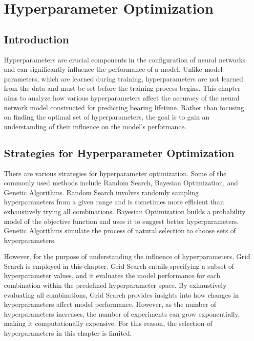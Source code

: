 \chapter{Hyperparameter Optimization}
\label{sec:hyperparameter_optimization}

\section{Introduction}

Hyperparameters are crucial components in the configuration of neural networks and can significantly influence the performance of a model. Unlike model parameters, which are learned during training, hyperparameters are not learned from the data and must be set before the training process begins. This chapter aims to analyze how various hyperparameters affect the accuracy of the neural network model constructed for predicting bearing lifetime. Rather than focusing on finding the optimal set of hyperparameters, the goal is to gain an understanding of their influence on the model's performance.


\section{Strategies for Hyperparameter Optimization}

There are various strategies for hyperparameter optimization. Some of the commonly used methods include Random Search, Bayesian Optimization, and Genetic Algorithms. Random Search involves randomly sampling hyperparameters from a given range and is sometimes more efficient than exhaustively trying all combinations. Bayesian Optimization builds a probability model of the objective function and uses it to suggest better hyperparameters. Genetic Algorithms simulate the process of natural selection to choose sets of hyperparameters.

However, for the purpose of understanding the influence of hyperparameters, Grid Search is employed in this chapter. Grid Search entails specifying a subset of hyperparameter values, and it evaluates the model performance for each combination within the predefined hyperparameter space. By exhaustively evaluating all combinations, Grid Search provides insights into how changes in hyperparameters affect model performance. However, as the number of hyperparameters increases, the number of experiments can grow exponentially, making it computationally expensive. For this reason, the selection of hyperparameters in this chapter is limited.


